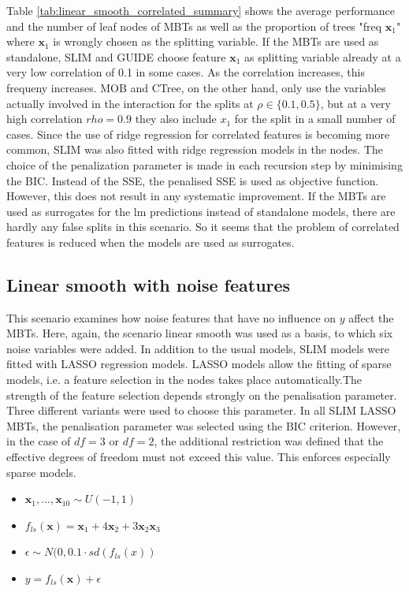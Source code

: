 Table \ref{tab:linear_smooth_correlated_summary} shows the average performance and the number of leaf nodes of MBTs  as well as the proportion of trees "freq $\textbf{x}_1$" where $\textbf{x}_1$ is wrongly chosen as the splitting variable.
If the MBTs are used as standalone, SLIM and GUIDE choose feature $\textbf{x}_1$ as splitting variable already at a very low correlation of 0.1 in some cases. As the correlation increases, this frequeny increases. MOB and CTree, on the other hand, only use the variables actually involved in the interaction for the splits at $\rho \in \{0.1, 0.5\}$, but at a very high correlation $rho = 0.9$ they also include $x_1$ for the split in a small number of cases. 
Since the use of ridge regression for correlated features is becoming more common, SLIM was also fitted with ridge regression models in the nodes. The choice of the penalization parameter is made in each recursion step by minimising the BIC. Instead of the SSE, the penalised SSE is used as objective function. However, this does not result in any systematic improvement. 
If the MBTs are used as surrogates for the lm predictions instead of standalone models, there are hardly any false splits in this scenario. So it seems that the problem of correlated features is reduced when the models are used as surrogates.


\subsection{Linear smooth with noise features}
This scenario examines how noise features that have no influence on $y$ affect the MBTs. Here, again, the scenario linear smooth was used as a basis, to which six noise variables were added.
In addition to the usual models, SLIM models were fitted with LASSO regression models. LASSO models allow the fitting of sparse models, i.e. a feature selection in the nodes takes place automatically.The strength of the feature selection depends strongly on the penalisation parameter. Three different variants were used to choose this parameter. In all SLIM LASSO MBTs, the penalisation parameter was selected using the BIC criterion. However, in the case of $df = 3$ or $df = 2$, the additional restriction was defined that the effective degrees of freedom must not exceed this value. This enforces especially sparse models.

\begin{itemize}
    \item $\textbf{x}_1,..., \textbf{x}_{10} \sim U(-1,1)$
    \item $ f_{ls}(\textbf{x}) = \textbf{x}_1 + 4   \textbf{x}_2 + 3   \textbf{x}_2   \textbf{x}_3 $
    \item $\epsilon \sim N(0, 0.1 \cdot sd(f_{ls}(x))$
    \item $y = f_{ls}(\textbf{x}) + \epsilon$
\end{itemize}

